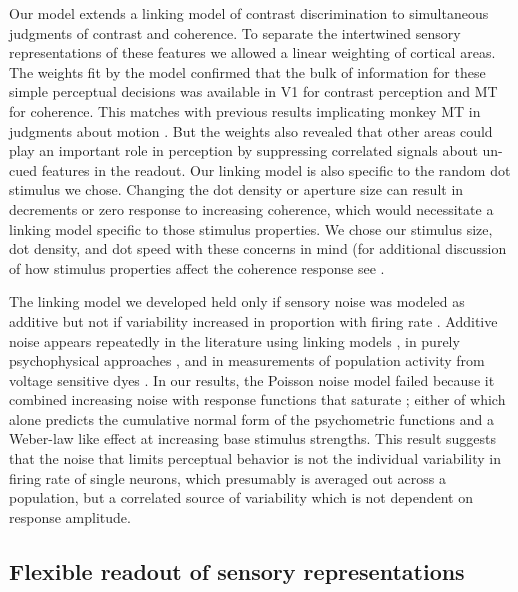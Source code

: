 Our model extends a linking model of contrast discrimination \citep{Boynton1999-jd} to simultaneous judgments of contrast and coherence. To separate the intertwined sensory representations of these features we allowed a linear weighting of cortical areas. The weights fit by the model confirmed that the bulk of information for these simple perceptual decisions was available in V1 for contrast perception and MT for coherence. This matches with previous results implicating monkey MT in judgments about motion \citep{Britten1996-ik,Katz2016-xc,Newsome1988-os}. But the weights also revealed that other areas could play an important role in perception by suppressing correlated signals about un-cued features in the readout. Our linking model is also specific to the random dot stimulus we chose. Changing the dot density \citep{Smith2006-cb} or aperture size \citep{Ajina2015-xm,Becker2008-uj,Costagli2014-kg} can result in decrements or zero response to increasing coherence, which would necessitate a linking model specific to those stimulus properties. We chose our stimulus size, dot density, and dot speed with these concerns in mind (for additional discussion of how stimulus properties affect the coherence response see \citet{Birman2018-sp}.  

The linking model we developed held only if sensory noise was modeled as additive but not if variability increased in proportion with firing rate \citep{Softky1993-ki}. Additive noise appears repeatedly in the literature using linking models \citep{Boynton1999-jd,Hara2014-mv,Pestilli2011-gi,Sapir2005-ri}, in purely psychophysical approaches \citep{Gorea2001-yt,Neri2010-hn,Neri2018-pu}, and in measurements of population activity from voltage sensitive dyes \citep{Chen2006-tt}. In our results, the Poisson noise model failed because it combined increasing noise with response functions that saturate \citep{Birman2018-sp}; either of which alone predicts the cumulative normal form of the psychometric functions and a Weber-law like effect at increasing base stimulus strengths. This result suggests that the noise that limits perceptual behavior is not the individual variability in firing rate of single neurons, which presumably is averaged out across a population, but a correlated source of variability which is not dependent on response amplitude.

\subsection{Flexible readout of sensory representations}

